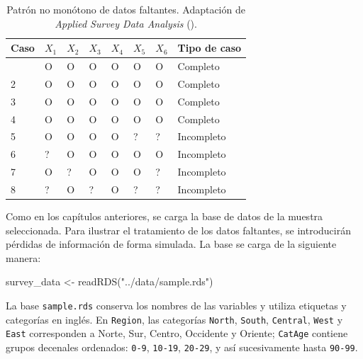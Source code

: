 \documentclass[
  spanish,
  11pt,
  letterpaper,
  oneside,
  open=any]{scrbook}
\newenvironment{Shaded}{\begin{snugshade}}{\end{snugshade}}
\newcommand{\FunctionTok}[1]{\textcolor[rgb]{0.28,0.35,0.67}{#1}}
\newcommand{\NormalTok}[1]{\textcolor[rgb]{0.00,0.23,0.31}{#1}}
\newcommand{\OtherTok}[1]{\textcolor[rgb]{0.00,0.23,0.31}{#1}}
\newcommand{\StringTok}[1]{\textcolor[rgb]{0.13,0.47,0.30}{#1}}
\begin{document}
{

\begin{longtable}[]{@{}llllllll@{}}

\caption{\label{tbl-ap3-patron-no-monotono}Patrón no monótono de datos
faltantes. Adaptación de \emph{Applied Survey Data Analysis}
().}

\tabularnewline

\toprule\noalign{}
Caso & \(X_1\) & \(X_2\) & \(X_3\) & \(X_4\) & \(X_5\) & \(X_6\) & Tipo
de caso \\
\midrule\noalign{}
\endhead
\bottomrule\noalign{}
\endlastfoot
1 & O & O & O & O & O & O & Completo \\
2 & O & O & O & O & O & O & Completo \\
3 & O & O & O & O & O & O & Completo \\
4 & O & O & O & O & O & O & Completo \\
5 & O & O & O & O & ? & ? & Incompleto \\
6 & ? & O & O & O & O & O & Incompleto \\
7 & O & ? & O & O & O & ? & Incompleto \\
8 & ? & O & ? & O & ? & ? & Incompleto \\

\end{longtable}

}

Como en los capítulos anteriores, se carga la base de datos de la
muestra seleccionada. Para ilustrar el tratamiento de los datos
faltantes, se introducirán pérdidas de información de forma simulada. La
base se carga de la siguiente manera:

\begin{Shaded}
\begin{Highlighting}[]
\NormalTok{survey\_data }\OtherTok{\textless{}{-}} \FunctionTok{readRDS}\NormalTok{(}\StringTok{"../data/sample.rds"}\NormalTok{)}
\end{Highlighting}
\end{Shaded}

La base \texttt{sample.rds} conserva los nombres de las variables y
utiliza etiquetas y categorías en inglés. En \texttt{Region}, las
categorías \texttt{North}, \texttt{South}, \texttt{Central},
\texttt{West} y \texttt{East} corresponden a Norte, Sur, Centro,
Occidente y Oriente; \texttt{CatAge} contiene grupos decenales
ordenados: \texttt{0-9}, \texttt{10-19}, \texttt{20-29}, y así
sucesivamente hasta \texttt{90-99}.
\end{document}
